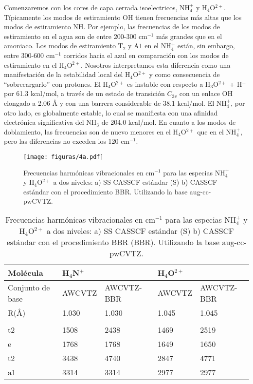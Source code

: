 \documentclass[12pt]{report}
\begin{document}
Comenzaremos con los cores de capa cerrada isoelectricos, NH$_4^+$ y H$_4$O$^{2+}$. Típicamente los modos de estiramiento OH tienen frecuencias más altas que los modos de estiramiento NH. Por ejemplo, las frecuencias de los modos de estiramiento en el agua son de entre 200-300 cm$^{-1}$ más grandes que en el amoniaco. Los modos de estiramiento T$_2$ y A$1$ en el NH$_4^+$ están, sin embargo, entre 300-600 cm$^{-1}$ corridos hacia el azul en comparación con los modos de estiramiento en el H$_4$O$^{2+}$. Nosotros interpretamos esta diferencia como una manifestación de la estabilidad local del H$_4$O$^{2+}$ y como consecuencia de “sobrecargarlo” con protones. El H$_4$O$^{2+}$ es instable con respecto a H$_3$O$^{2+}$ + H$^+$ por 61.3 kcal/mol, a través de un estado de transición $C_{3v}$ con un enlace OH elongado a 2.06 \AA $ $ y con una barrera considerable de 38.1 kcal/mol. El NH$_4^+$, por otro lado, es globalmente estable, lo cual se manifiesta con una afinidad electrónica significativa del NH$_3$ de 204.0 kcal/mol. En cuanto a los modos de doblamiento, las frecuencias son de nuevo menores en el H$_4$O$^{2+}$ que en el NH$_4^+$, pero las diferencias no exceden los 120 cm$^{-1}$.

\begin{figure}[h!]
\centering
\texttt{[image: figuras/4a.pdf]} 
\caption{Frecuencias harmónicas vibracionales en cm$^{-1}$ para las especias NH$_4^+$ y H$_4$O$^{2+}$ a dos niveles:  a) SS CASSCF estándar (S) b) CASSCF estándar con el procedimiento BBR. Utilizando la base aug-cc-pwCVTZ.}
\label{rmonocationes2}
\end{figure}

\begin{table}[h!]
\centering
\begin{tabular}{l|ll|ll}
\hline
Molécula &    H$_4$N$^+$ &  &    H$_4$O$^{2+}$ &  \\ \hline
Conjunto de base &  \multicolumn{1}{l|}{AWCVTZ} & AWCVTZ-BBR  & \multicolumn{1}{l|}{AWCVTZ} & AWCVTZ-BBR \\ \hline
R(\AA) & \multicolumn{1}{l|}{1.030} & 1.030 & \multicolumn{1}{l|}{1.045} & 1.045 \\
 & \multicolumn{1}{l|}{} &  & \multicolumn{1}{l|}{} &  \\
t2 & \multicolumn{1}{l|}{1508} & 2438 & \multicolumn{1}{l|}{1469} & 2519 \\
e & \multicolumn{1}{l|}{1768} & 1768 & \multicolumn{1}{l|}{1649} & 1650 \\
t2 & \multicolumn{1}{l|}{3438} & 4740 & \multicolumn{1}{l|}{2847} & 4771 \\
a1 & \multicolumn{1}{l|}{3314} & 3314 & \multicolumn{1}{l|}{2977} & 2977 \\ \hline
\end{tabular}
\caption{Frecuencias harmónicas vibracionales en cm$^{-1}$ para las especias NH$_4^+$ y H$_4$O$^{2+}$ a dos niveles:  a) SS CASSCF estándar (S) b) CASSCF estándar con el procedimiento BBR (BBR). Utilizando la base aug-cc-pwCVTZ.}
\end{table}
\end{document}
